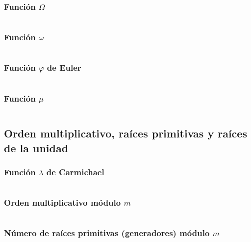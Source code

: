 \documentclass[11pt]{article}
\begin{document}
			\subsubsection{Función $\Omega$}
			\inputminted[tabsize=2,breaklines,firstline=237,lastline=245,fontsize=\small]{c++}{numberTheory.cpp}
			
			\subsubsection{Función $\omega$}
			\inputminted[tabsize=2,breaklines,firstline=247,lastline=255,fontsize=\small]{c++}{numberTheory.cpp}
			
			\subsubsection{Función $\varphi$ de Euler}
			\inputminted[tabsize=2,breaklines,firstline=262,lastline=270,fontsize=\small]{c++}{numberTheory.cpp}
			
			\subsubsection{Función $\mu$}
			\inputminted[tabsize=2,breaklines,firstline=288,lastline=299,fontsize=\small]{c++}{numberTheory.cpp}
			
		\subsection{Orden multiplicativo, raíces primitivas y raíces de la unidad}
			\subsubsection{Función $\lambda$ de Carmichael}
			\inputminted[tabsize=2,breaklines,firstline=272,lastline=286,fontsize=\small]{c++}{numberTheory.cpp}
			
			\subsubsection{Orden multiplicativo módulo $m$}
			\inputminted[tabsize=2,breaklines,firstline=301,lastline=317,fontsize=\small]{c++}{numberTheory.cpp}
			
			\subsubsection{Número de raíces primitivas (generadores) módulo $m$}
			\inputminted[tabsize=2,breaklines,firstline=319,lastline=325,fontsize=\small]{c++}{numberTheory.cpp}
			
\end{document}
